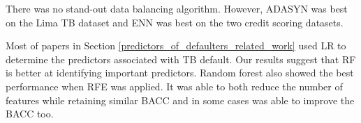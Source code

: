 \documentclass{sig-alternate-05-2015}
\begin{document}
	There was no stand-out data balancing algorithm. However, ADASYN was best on the Lima TB dataset and ENN was best on the two credit scoring datasets.
		
	Most of papers in Section \ref{predictors_of_defaulters_related_work} used LR to determine the predictors associated with TB default. Our results suggest that RF is better at identifying important predictors. Random forest also showed the best performance when RFE was applied. It was able to both reduce the number of features while retaining similar BACC and in some cases was able to improve the BACC too.
	
\end{document}

